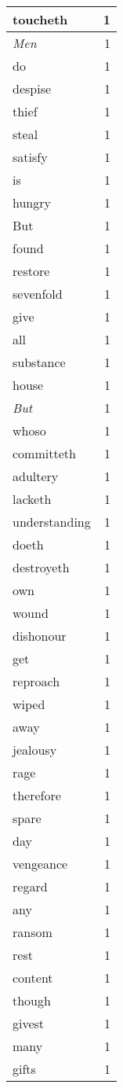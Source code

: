 \begin{center}
\begin{longtable}{l|r}
toucheth & 1\\ \hline 
\emph{Men} & 1\\ \hline 
do & 1\\ \hline 
despise & 1\\ \hline 
thief & 1\\ \hline 
steal & 1\\ \hline 
satisfy & 1\\ \hline 
is & 1\\ \hline 
hungry & 1\\ \hline 
But & 1\\ \hline 
found & 1\\ \hline 
restore & 1\\ \hline 
sevenfold & 1\\ \hline 
give & 1\\ \hline 
all & 1\\ \hline 
substance & 1\\ \hline 
house & 1\\ \hline 
\emph{But} & 1\\ \hline 
whoso & 1\\ \hline 
committeth & 1\\ \hline 
adultery & 1\\ \hline 
lacketh & 1\\ \hline 
understanding & 1\\ \hline 
doeth & 1\\ \hline 
destroyeth & 1\\ \hline 
own & 1\\ \hline 
wound & 1\\ \hline 
dishonour & 1\\ \hline 
get & 1\\ \hline 
reproach & 1\\ \hline 
wiped & 1\\ \hline 
away & 1\\ \hline 
jealousy & 1\\ \hline 
rage & 1\\ \hline 
therefore & 1\\ \hline 
spare & 1\\ \hline 
day & 1\\ \hline 
vengeance & 1\\ \hline 
regard & 1\\ \hline 
any & 1\\ \hline 
ransom & 1\\ \hline 
rest & 1\\ \hline 
content & 1\\ \hline 
though & 1\\ \hline 
givest & 1\\ \hline 
many & 1\\ \hline 
gifts & 1\\ \hline 
\end{longtable}  
\end{center}  


